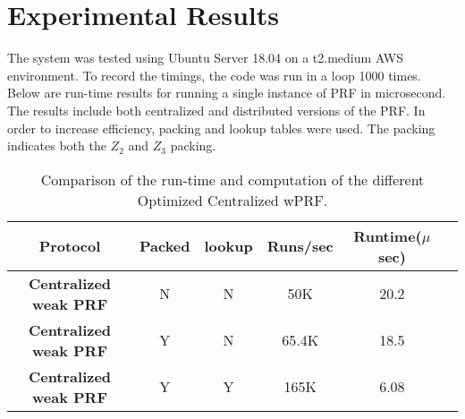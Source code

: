 \section{Experimental Results}

The system was tested using Ubuntu Server 18.04 on a t2.medium AWS environment. To record the timings, the code was run in a loop 1000 times. Below are run-time results for running a single instance of PRF in microsecond. The results include both centralized and distributed versions of the PRF. In order to increase efficiency, packing and lookup tables were used. The packing indicates both the $Z_2$ and $Z_3$ packing.

\begin{table}[htbp]
	\begin{center}
		\begin{tabular}{|c|c|c|c|c|c|}
			\hline
			\textbf{Protocol} & \textbf{Packed }  &  \textbf{lookup} & \textbf{Runs/sec} & \textbf{Runtime($\mu$ sec)}\\
			\hline
			\hline
			\textbf{Centralized weak PRF}  & N  & N  &  50K&20.2 \\
			\hline
			\textbf{Centralized weak PRF} & Y  &  N & 65.4K &18.5  \\
			\hline
			\textbf{Centralized weak PRF} & Y  &  Y & 165K &6.08 \\
			\hline
		\end{tabular}
		
		\vspace{-1mm}
		\caption{Comparison of the run-time and computation of the different Optimized Centralized wPRF.}
		\label{CentralRuntimeTable}
	\end{center}
	\vspace{-5mm}
\end{table}

